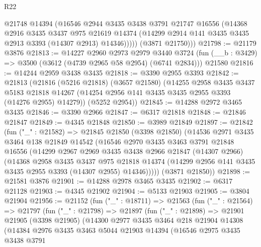 \begin{lexlean}{R22}
\begin{coremodule}
            @21748
            @14394
            (@16546
              @2944
              @3435
              @3438
              @3791
              @21747
              @16556
              (@14368
                @2916
                @3435
                @3437
                @975
                @21619
                @14374
                (@14299 @2914 @141 @3435 @3435 @2913 @3393 (@14307 @2913) @14346)))))
        (@3871 @21750)))
@21798 := @21179 @3876
@21813 := @14227
    @2960
    @2973
    @2979
    @3440
    @3724
    (fun (__b : @3429) => @3500 (@3612 (@4739 @2965 @58 @2954) (@6741 @2834)))
    @21580
@21816 := @14244 @2959 @3438 @3435
@21818 := @3390 @2955 @3393
@21842 := @21813
    (@21816
      (@5216 @21818)
      (@3657 @21580)
      (@14255
        @2958
        @3435
        @3437
        @5183
        @21818
        @14267
        (@14254 @2956 @141 @3435 @3435 @2955 @3393 (@14276 @2955) @14279))
      (@5252 @2954))
@21845 := @14288 @2972 @3465 @3435
@21846 := @3390 @2966
@21847 := @6317 @21818
@21848 := @21846 @21847
@21849 := @4345 @21848
@21850 := @3989 @21849
@21897 := @21842
    (fun ("_" : @21582) =>
    @21845
      @21850
      (@3398 @21850)
      (@14536
        @2971
        @3435
        @3464
        @138
        @21849
        @14542
        (@16546
          @2970
          @3435
          @3463
          @3791
          @21848
          @16556
          (@14299
            @2967
            @2969
            @3435
            @3438
            @2966
            @21847
            (@14307 @2966)
            (@14368
              @2958
              @3435
              @3437
              @975
              @21818
              @14374
              (@14299 @2956 @141 @3435 @3435 @2955 @3393 (@14307 @2955) @14346)))))
      (@3871 @21850))
@21898 := @21581 @3876
@21901 := @14288 @2978 @3465 @3435
@21902 := @6317 @21128
@21903 := @4345 @21902
@21904 := @5133 @21903
@21905 := @3804 @21904
@21956 := @21152
    (fun ("_" : @18711) =>
    @21563
      (fun ("_" : @21564) =>
      @21797
        (fun ("_" : @21798) =>
        @21897
          (fun ("_" : @21898) =>
          @21901
            @21905
            (@3398 @21905)
            (@14300
              @2977
              @3435
              @3464
              @218
              @21904
              @14308
              (@14384
                @2976
                @3435
                @3463
                @5044
                @21903
                @14394
                (@16546
                  @2975
                  @3435
                  @3438
                  @3791

\end{coremodule}
\end{lexlean}
